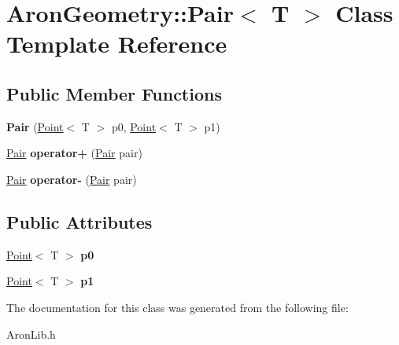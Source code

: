 \hypertarget{class_aron_geometry_1_1_pair}{}\section{Aron\+Geometry\+:\+:Pair$<$ T $>$ Class Template Reference}
\label{class_aron_geometry_1_1_pair}
\subsection*{Public Member Functions}
\begin{DoxyCompactItemize}
\item 
\mbox{\label{class_aron_geometry_1_1_pair_a80516e37ec697f52990a300763d23e99}} 
{\bfseries Pair} (\mbox{\hyperlink{class_aron_geometry_1_1_point}{Point}}$<$ T $>$ p0, \mbox{\hyperlink{class_aron_geometry_1_1_point}{Point}}$<$ T $>$ p1)
\item 
\mbox{\label{class_aron_geometry_1_1_pair_a05da2787bf15b098347e4c607159534b}} 
\mbox{\hyperlink{class_aron_geometry_1_1_pair}{Pair}} {\bfseries operator+} (\mbox{\hyperlink{class_aron_geometry_1_1_pair}{Pair}} pair)
\item 
\mbox{\label{class_aron_geometry_1_1_pair_a28541db6d38c0512add73570085443c3}} 
\mbox{\hyperlink{class_aron_geometry_1_1_pair}{Pair}} {\bfseries operator-\/} (\mbox{\hyperlink{class_aron_geometry_1_1_pair}{Pair}} pair)
\end{DoxyCompactItemize}
\subsection*{Public Attributes}
\begin{DoxyCompactItemize}
\item 
\mbox{\label{class_aron_geometry_1_1_pair_adc3d8337ca7d79e106cf451a9d17bfe2}} 
\mbox{\hyperlink{class_aron_geometry_1_1_point}{Point}}$<$ T $>$ {\bfseries p0}
\item 
\mbox{\label{class_aron_geometry_1_1_pair_acc8fd3291f807adc21c5f8bdc35d96db}} 
\mbox{\hyperlink{class_aron_geometry_1_1_point}{Point}}$<$ T $>$ {\bfseries p1}
\end{DoxyCompactItemize}


The documentation for this class was generated from the following file\+:\begin{DoxyCompactItemize}
\item 
Aron\+Lib.\+h\end{DoxyCompactItemize}
